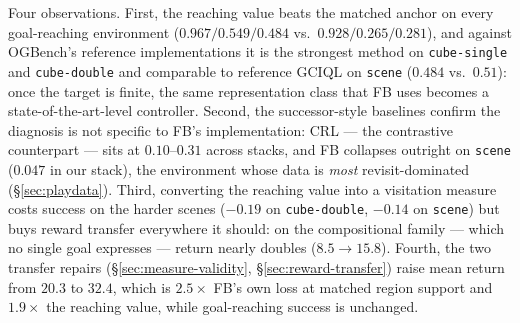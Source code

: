 \documentclass{article}
\begin{document}
\begin{table}[t]
\caption{Main comparison. \emph{Left:} benchmark goal-reaching success
(\texttt{cube-single}/\texttt{cube-double}/\texttt{scene} play datasets,
$500$k steps; the degenerate \texttt{puzzle-3x3}, where our matched stack
solves only task 1, is omitted). The top block quotes the OGBench paper's
reference implementations verbatim (different architectures and tuning); the
middle block re-implements baselines in our matched stack. \emph{Right:}
absolute discounted return on $48$ held-out rewards, grouped by spatial
support (family means of two seeds; rewards in $[0,1]$, returns in $[0,86.6]$,
behavior-policy baseline $8.1$). Rows below the second rule are cumulative, except the
$^\dagger$ row, which replaces the visitation phase's batch query goals with
hindsight (trajectory-future) queries on the multi-object environments only
(\S\ref{sec:multienv-zeroshot}; three-seed means; on \texttt{cube-single} the
swap costs $0.17$--$0.24$ success and is not applied, and it is not composed
with the two \texttt{cube-single}-only repairs below it).
Dashes: not run in that cell. The reaching value's broad-reward return is high
because a $16$\,cm ball rewards almost any motion; the compositional and
concentrated families are where occupancy semantics pay.}
\label{tab:main}
\end{table}

Four observations. First, the reaching value beats the matched anchor on every
goal-reaching environment ($0.967/0.549/0.484$ vs.\ $0.928/0.265/0.281$), and
against OGBench's reference implementations it is the strongest method on
\texttt{cube-single} and \texttt{cube-double} and comparable to reference
GCIQL on \texttt{scene} ($0.484$ vs.\ $0.51$): once the target is finite, the
same representation class that FB uses becomes a state-of-the-art-level
controller. Second, the successor-style baselines confirm the diagnosis is not
specific to FB's implementation: CRL --- the contrastive counterpart --- sits
at $0.10$--$0.31$ across stacks, and FB collapses outright on \texttt{scene}
($0.047$ in our stack), the environment whose data is \emph{most}
revisit-dominated (\S\ref{sec:playdata}). Third, converting the reaching value
into a visitation measure costs success on the harder scenes ($-0.19$ on
\texttt{cube-double}, $-0.14$ on \texttt{scene}) but buys reward transfer
everywhere it should: on the compositional family --- which no single goal
expresses --- return nearly doubles ($8.5\to15.8$). Fourth, the two transfer
repairs (\S\ref{sec:measure-validity}, \S\ref{sec:reward-transfer}) raise mean
return from $20.3$ to $32.4$, which is $2.5\times$ FB's own loss at matched
region support and $1.9\times$ the reaching value, while goal-reaching success
is unchanged.
\end{document}
